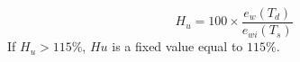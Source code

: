 \[
H_u = 100 \times \frac{e_w(T_d)}{e_{wi}(T_s)} 
\]
If $H_u > 115 \%$, $Hu$ is a fixed value equal to $115 \%$.

